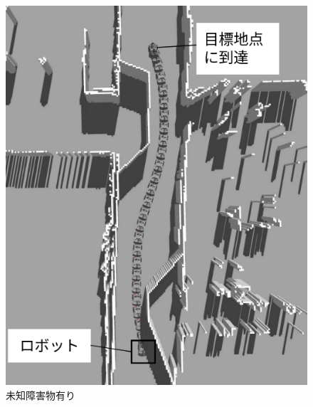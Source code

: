 \begin{figure}[htbp]
  \begin{minipage}[b]{0.5\linewidth}
    \centering
    \includegraphics[keepaspectratio, scale=0.32]{figs/no_implementation_no_reset.png}
    \caption{未知障害物有り}
    \label{fig:gazebo_unknown}
  \end{minipage}
  \begin{minipage}[b]{0.5\linewidth}
    \centering

\end{minipage}
\end{figure}
